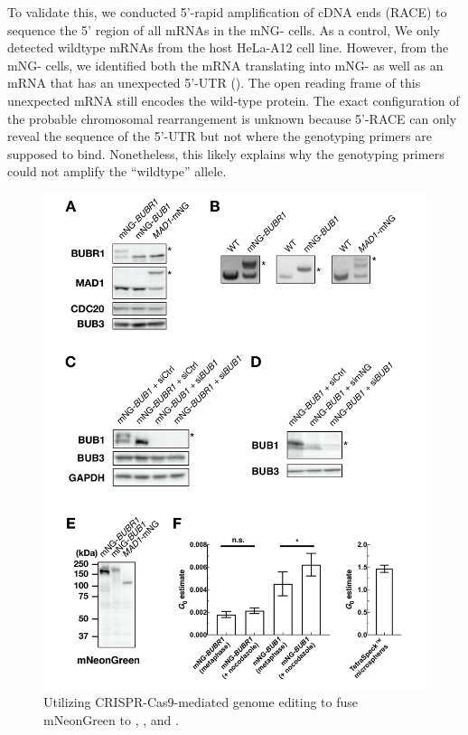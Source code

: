 To validate this, we conducted 5'-rapid amplification of cDNA ends (RACE) to sequence the 5' region of all  mRNAs in the mNG- cells. As a control, We only detected wildtype  mRNAs from the host HeLa-A12 cell line. However, from the mNG- cells, we identified both the mRNA translating into mNG- as well as an mRNA that has an unexpected 5'-UTR (). The open reading frame of this unexpected mRNA still encodes the wild-type  protein. The exact configuration of the probable chromosomal rearrangement is unknown because 5'-RACE can only reveal the sequence of the 5'-UTR but not where the genotyping primers are supposed to bind. Nonetheless, this likely explains why the genotyping primers could not amplify the ``wildtype'' allele.

\begin{figure}
    \centering
    \includegraphics[width=\textwidth]{chapters/figures/CRISPRValidation.pdf}
    \caption{Utilizing CRISPR-Cas9-mediated genome editing to fuse mNeonGreen to , , and  .}
    \label{CRISPRValidation}
\end{figure}

